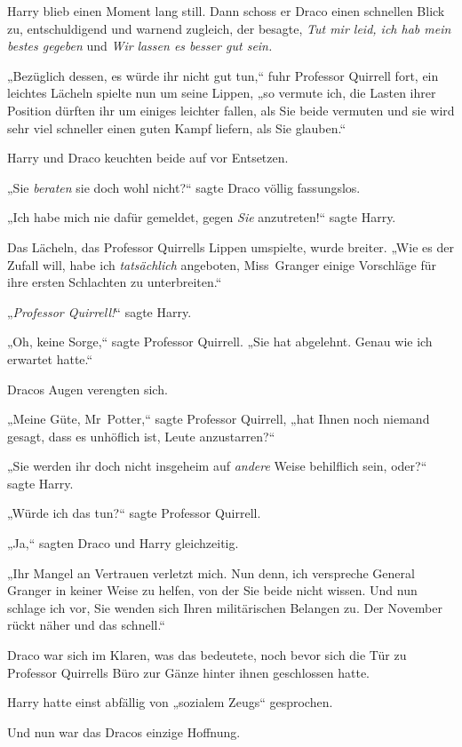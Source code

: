 {Harry blieb einen Moment lang still. Dann schoss er Draco einen schnellen Blick zu, entschuldigend und warnend zugleich, der besagte, \emph{Tut mir leid, ich hab mein bestes gegeben} und \emph{Wir} \emph{lassen es besser gut sein.}

„Bezüglich dessen, es würde ihr nicht gut tun,“ fuhr Professor Quirrell fort, ein leichtes Lächeln spielte nun um seine Lippen, „so vermute ich, die Lasten ihrer Position dürften ihr um einiges leichter fallen, als Sie beide vermuten und sie wird sehr viel schneller einen guten Kampf liefern, als Sie glauben.“

Harry und Draco keuchten beide auf vor Entsetzen.

„Sie \emph{beraten} sie doch wohl nicht?“ sagte Draco völlig fassungslos.

„Ich habe mich nie dafür gemeldet, gegen \emph{Sie} anzutreten!“ sagte Harry.

Das Lächeln, das Professor Quirrells Lippen umspielte, wurde breiter. „Wie es der Zufall will, habe ich \emph{tatsächlich} angeboten, Miss~Granger einige Vorschläge für ihre ersten Schlachten zu unterbreiten.“

„\emph{Professor Quirrell!}“ sagte Harry.

„Oh, keine Sorge,“ sagte Professor Quirrell. „Sie hat abgelehnt. Genau wie ich erwartet hatte.“

Dracos Augen verengten sich.

„Meine Güte, Mr~Potter,“ sagte Professor Quirrell, „hat Ihnen noch niemand gesagt, dass es unhöflich ist, Leute anzustarren?“

„Sie werden ihr doch nicht insgeheim auf \emph{andere} Weise behilflich sein, oder?“ sagte Harry.

„Würde ich das tun?“ sagte Professor Quirrell.

„Ja,“ sagten Draco und Harry gleichzeitig.

„Ihr Mangel an Vertrauen verletzt mich. Nun denn, ich verspreche General Granger in keiner Weise zu helfen, von der Sie beide nicht wissen. Und nun schlage ich vor, Sie wenden sich Ihren militärischen Belangen zu. Der November rückt näher und das schnell.“

\later

Draco war sich im Klaren, was das bedeutete, noch bevor sich die Tür zu Professor Quirrells Büro zur Gänze hinter ihnen geschlossen hatte.

Harry hatte einst abfällig von „sozialem Zeugs“ gesprochen.

Und nun war das Dracos einzige Hoffnung.

}
